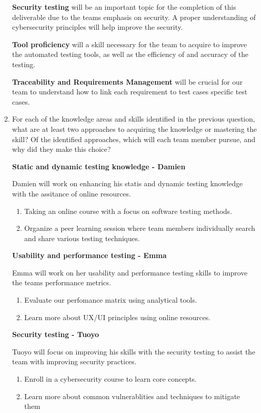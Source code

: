 \documentclass[12pt, titlepage]{article}
\begin{document}
\begin{enumerate}
          \textbf{Security testing} will be an important topic for the completion of
          this deliverable due to the teams emphasis on security. A proper
          understanding of cybersecurity principles will help improve the security.

          \textbf{Tool proficiency} will a skill necessary for the team to acquire to
          improve the automated testing tools, as well as the efficiency of and accuracy
          of the testing.

          \textbf{Traceability and Requirements Management} will be crucial for our team
          to understand how to link each requirement to test cases specific test cases.

    \item For each of the knowledge areas and skills identified in the previous
          question, what are at least two approaches to acquiring the knowledge or
          mastering the skill?  Of the identified approaches, which will each team
          member pursue, and why did they make this choice?

          \textbf{Static and dynamic testing knowledge - Damien}

          Damien will work on enhancing his statis and dynamic testing knowledge with the
          assitance of online resources.
          \begin{enumerate}
              \item Taking an online course with a focus on software testing methods.
              \item Organize a peer learning session where team members individually
                    search and share various testing techniques.
          \end{enumerate}
          \textbf{Usability and performance testing - Emma}

          Emma will work on her usability and performance testing skills to improve
          the teams performance metrics.
          \begin{enumerate}
              \item Evaluate our perfomance matrix using analytical tools.
              \item Learn more about UX/UI principles using online resources.
          \end{enumerate}
          \textbf{Security testing - Tuoyo}

          Tuoyo will focus on improving his skills with the security testing to assist
          the team with improving security practices.
          \begin{enumerate}
              \item Enroll in a cybersecurity course to learn core concepts.
              \item Learn more about common vulnerablities and techniques to mitigate them
          \end{enumerate}


\end{enumerate}
\end{document}

